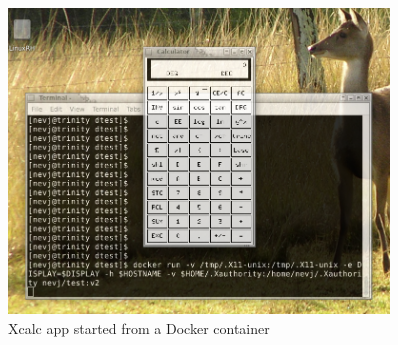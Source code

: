 %

\begin{figure}[!h]
  \centering
   \includegraphics[width=0.9\textwidth]{xcalc.png}
  \caption{Xcalc app started from a Docker container}
  \label{fig:xcalc}
\end{figure}

%

